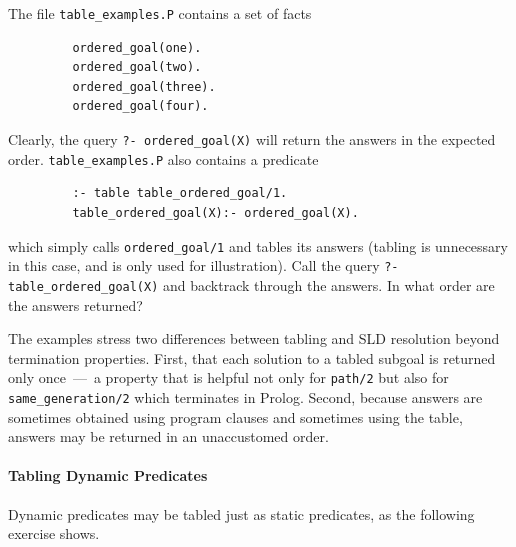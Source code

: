 \begin{exercise}
The file {\tt table\_examples.P} contains a set of facts
\begin{verbatim}
         ordered_goal(one).
         ordered_goal(two).
         ordered_goal(three).
         ordered_goal(four).
\end{verbatim}
Clearly, the query {\tt ?- ordered\_goal(X)} will return the answers
in the expected order.  {\tt table\_examples.P} also contains a predicate
\begin{verbatim}
         :- table table_ordered_goal/1.
         table_ordered_goal(X):- ordered_goal(X).
\end{verbatim}
which simply calls {\tt ordered\_goal/1} and tables its answers
(tabling is unnecessary in this case, and is only used for
illustration).  Call the query {\tt ?- table\_ordered\_goal(X)} and
backtrack through the answers.  In what order are the answers
returned?
\end{exercise}
The examples stress two differences between tabling and SLD resolution
beyond termination properties.  First, that each solution to a tabled
subgoal is returned only once~---~a property that is helpful not only
for {\tt path/2} but also for {\tt same\_generation/2} which
terminates in Prolog.  Second, because answers are sometimes obtained
using program clauses and sometimes using the table, answers may be
returned in an unaccustomed order.

\paragraph*{Tabling Dynamic Predicates}

Dynamic predicates may be tabled just as static predicates, as the
following exercise shows.

